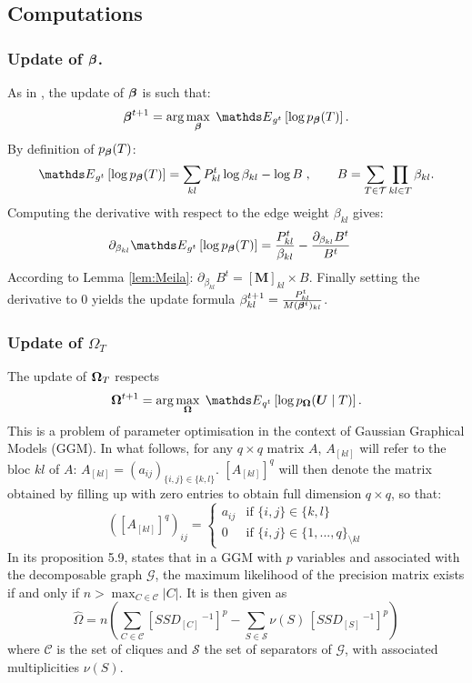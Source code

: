 
\tocless\subsection{Computations} \label{app:comput}
\subsubsection[Update of tree parameter vector]{Update of ${\boldsymbol{\beta}}$.} \label{up:beta}
As in \citet{MRA20}, the update of ${\boldsymbol{\beta}}$ is such that:
$$\betabf^{t+1}  = \arg\max_\betabf \; \Esp_{g^t} \left[ \log p_\betabf(T) \right].
$$
By definition of $p_{\boldsymbol{\beta}}(T)$:
$$\Esp_{g^t} \left[ \log p_\betabf(T) \right] = \sum_{kl} P^t_{kl} \log \beta_{kl} - \log B\;,
\qquad
B=\sum_{T\in \mathcal{T}}\prod_{kl\in T} \beta_{kl}.$$
Computing the derivative with respect to the edge weight $\beta_{kl}$ gives:
\begin{align*}
\partial_{\beta_{kl}}\Esp_{g^t} \left[ \log p_\betabf(T) \right] &=\frac{P_{kl}^t}{\beta_{kl}} - \frac{\partial_{\beta_{kl}} B^t }{B^t} 
\end{align*}
According to Lemma \ref{lem:Meila}: $\partial_{\beta_{kl}} B^t  = [\boldsymbol{M}]_{kl} \times B$. Finally setting the derivative to 0 yields the update formula $
\beta^{t+1}_{kl} 
= \frac{P^t_{kl}}{ M({\boldsymbol{\beta}}^t)_{kl}}$.

\subsubsection[Update of Gaussian tree precision matrix]{Update of $\Omega_T$} \label{up:omega}
The update of ${\boldsymbol{\Omega}}_T$ respects
$$\Omegabf^{t+1}  = \arg\max_\Omegabf \; \Esp_{q^t} \left[ \log p_{\Omegabf}(\Ubf \mid T) \right].$$
This is a problem of parameter optimisation in the context of Gaussian Graphical Models (GGM).
In what follows, for any $q\times q$  matrix $A$, $A_{[kl]}$ will refer to the bloc $kl$ of $A$: $A_{[kl]}=(a_{ij})_{\{i,j\}\in\{k,l\}}$.   $[A_{[kl]}]^q$ will then denote the matrix obtained by filling up with zero entries to obtain full dimension $q\times q$, so that:
$$([A_{[kl]}]^q )_{ij}=\left\{ \begin{array}{rl}
a_{ij} & \text{if } \{i,j\}\in\{k,l\}\\
0 &  \text{if } \{i,j\}\in\{1,..., q\}_{\setminus kl}
\end{array}\right.$$
In its proposition 5.9, \citet{Lau96} states that in a  GGM with $p$ variables and associated with the decomposable graph $\mathcal{G}$, the maximum likelihood of the precision matrix exists if and only if $n > \max_{C\in \mathcal{C}} |C|$. It is then given as 
$$\widehat{\Omega}=n\left(\sum_{C\in \mathcal{C}} [SSD_{[C]}\,^{-1}]^p - \sum_{S\in \mathcal{S}} \nu(S)\,[SSD_{[S]}\,^{-1}]^p \right)$$
where $\mathcal{C}$ is the set of cliques and $\mathcal{S}$ the set of separators of $\mathcal{G}$, with associated multiplicities $\nu(S)$.\\


